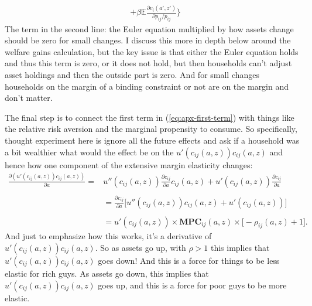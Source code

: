 \documentclass[12pt,pdftex]{article}
\begin{document}
\begin{onehalfspacing}
\begin{align}
\nonumber \\
&+  \beta \mathbb{E}\frac{\partial v_{i}(a',z')}{\partial p_{ij}/ p_{ij}} \bigg \}
\end{align}
The term in the second line: the Euler equation multiplied by how assets change should be zero for small changes. I discuss this more in depth below around the welfare gains calculation, but the key issue is that either the Euler equation holds and thus this term is zero, or it does not hold, but then households can't adjust asset holdings and then the outside part is zero. And for small changes households on the margin of a binding constraint or not are on the margin and don't matter.

The final step is to connect the first term in (\ref{eq:apx-first-term}) with things like the relative risk aversion and the marginal propensity to consume. So specifically, thought experiment here is ignore all the future effects and ask if a household was a bit wealthier what would the effect be on the $u'(c_{ij}(a,z))c_{ij}(a,z)$ and hence how one component of the extensive margin elasticity changes:
\begin{align}
\frac{\partial (u'(c_{ij}(a,z))c_{ij}(a,z))}{\partial a} =& u''(c_{ij}(a,z))\frac{\partial c_{ij}}{\partial a}c_{ij}(a,z) + u'(c_{ij}(a,z))\frac{\partial c_{ij}}{\partial a} \\
\nonumber \\
&= \frac{\partial c_{ij}}{\partial a}\bigg[u''(c_{ij}(a,z))c_{ij}(a,z) + u'(c_{ij}(a,z)) \bigg] \\
\nonumber\\
&= u'(c_{ij}(a,z))\times \mathbf{MPC}_{ij}(a,z) \times \bigg[-\rho_{ij}(a,z) + 1\bigg]. \label{eq:apx-elasticity-mpc}
\end{align}
And just to emphasize how this works, it's a derivative of $u'(c_{ij}(a,z))c_{ij}(a,z)$. So as assets go up, with $\rho > 1$ this implies that $u'(c_{ij}(a,z))c_{ij}(a,z)$ goes down! And this is a force for things to be less elastic for rich guys. As assets go down, this implies that $u'(c_{ij}(a,z))c_{ij}(a,z)$ goes up, and this is a force for poor guys to be more elastic.


\end{onehalfspacing}
\end{document}
